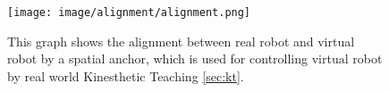\begin{figure}[h!]
    \centering
    \texttt{[image: image/alignment/alignment.png]}
    \caption{This graph shows the alignment between real robot and virtual robot by a spatial anchor, which is used for controlling virtual robot by real world Kinesthetic Teaching \ref{sec:kt}.}
    \label{fig:alignment}
\end{figure}